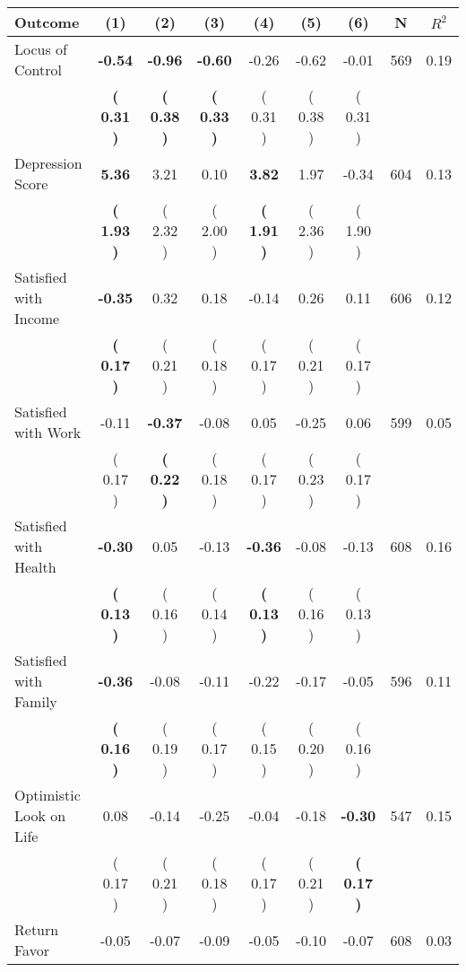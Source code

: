 \begin{tabular}{lcccccccc}
\toprule
 \textbf{Outcome} & \textbf{(1)} & \textbf{(2)} & \textbf{(3)} & \textbf{(4)} & \textbf{(5)} & \textbf{(6)} & \textbf{N} & \textbf{$ R^2$} \\
\midrule
Locus of Control & \textbf{    -0.54} & \textbf{    -0.96} & \textbf{    -0.60} &     -0.26 &     -0.62 &     -0.01 & 569 &       0.19 \\ 
 & \textbf{(     0.31 )} & \textbf{(     0.38 )} & \textbf{(     0.33 )} & (     0.31 ) & (     0.38 ) & (     0.31 ) & \\
Depression Score & \textbf{     5.36} &      3.21 &      0.10 & \textbf{     3.82} &      1.97 &     -0.34 & 604 &       0.13 \\ 
 & \textbf{(     1.93 )} & (     2.32 ) & (     2.00 ) & \textbf{(     1.91 )} & (     2.36 ) & (     1.90 ) & \\
Satisfied with Income & \textbf{    -0.35} &      0.32 &      0.18 &     -0.14 &      0.26 &      0.11 & 606 &       0.12 \\ 
 & \textbf{(     0.17 )} & (     0.21 ) & (     0.18 ) & (     0.17 ) & (     0.21 ) & (     0.17 ) & \\
Satisfied with Work &     -0.11 & \textbf{    -0.37} &     -0.08 &      0.05 &     -0.25 &      0.06 & 599 &       0.05 \\ 
 & (     0.17 ) & \textbf{(     0.22 )} & (     0.18 ) & (     0.17 ) & (     0.23 ) & (     0.17 ) & \\
Satisfied with Health & \textbf{    -0.30} &      0.05 &     -0.13 & \textbf{    -0.36} &     -0.08 &     -0.13 & 608 &       0.16 \\ 
 & \textbf{(     0.13 )} & (     0.16 ) & (     0.14 ) & \textbf{(     0.13 )} & (     0.16 ) & (     0.13 ) & \\
Satisfied with Family & \textbf{    -0.36} &     -0.08 &     -0.11 &     -0.22 &     -0.17 &     -0.05 & 596 &       0.11 \\ 
 & \textbf{(     0.16 )} & (     0.19 ) & (     0.17 ) & (     0.15 ) & (     0.20 ) & (     0.16 ) & \\
Optimistic Look on Life &      0.08 &     -0.14 &     -0.25 &     -0.04 &     -0.18 & \textbf{    -0.30} & 547 &       0.15 \\ 
 & (     0.17 ) & (     0.21 ) & (     0.18 ) & (     0.17 ) & (     0.21 ) & \textbf{(     0.17 )} & \\
Return Favor &     -0.05 &     -0.07 &     -0.09 &     -0.05 &     -0.10 &     -0.07 & 608 &       0.03 \\ 

\end{tabular}
